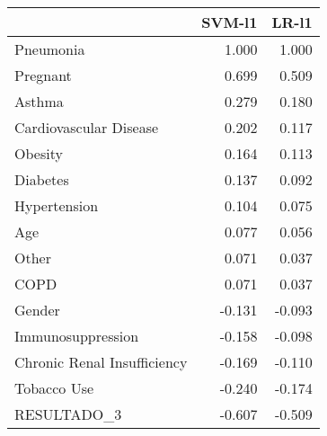 \begin{tabular}{lrr}
\toprule
{} &  SVM-l1 &  LR-l1 \\
\midrule
Pneumonia                   &   1.000 &  1.000 \\
Pregnant                    &   0.699 &  0.509 \\
Asthma                      &   0.279 &  0.180 \\
Cardiovascular Disease      &   0.202 &  0.117 \\
Obesity                     &   0.164 &  0.113 \\
Diabetes                    &   0.137 &  0.092 \\
Hypertension                &   0.104 &  0.075 \\
Age                         &   0.077 &  0.056 \\
Other                       &   0.071 &  0.037 \\
COPD                        &   0.071 &  0.037 \\
Gender                      &  -0.131 & -0.093 \\
Immunosuppression           &  -0.158 & -0.098 \\
Chronic Renal Insufficiency &  -0.169 & -0.110 \\
Tobacco Use                 &  -0.240 & -0.174 \\
RESULTADO\_3                 &  -0.607 & -0.509 \\
\bottomrule
\end{tabular}
